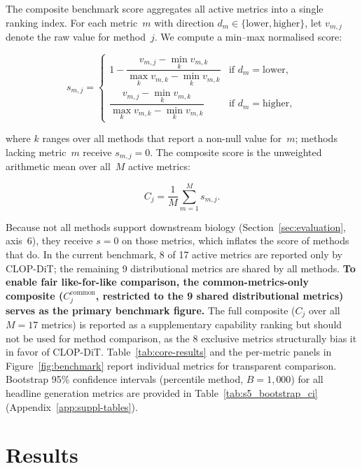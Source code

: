 \documentclass[genes,article,submit,pdftex,oneauthor]{Definitions/mdpi}
\begin{document}
The composite benchmark score aggregates all active metrics into a single ranking index. For each metric~$m$ with direction $d_m \in \{\text{lower}, \text{higher}\}$, let $v_{m,j}$ denote the raw value for method~$j$. We compute a min--max normalised score:
\begin{linenomath}
\begin{equation}
  s_{m,j} =
  \begin{cases}
    1 - \dfrac{v_{m,j} - \min_k v_{m,k}}{\max_k v_{m,k} - \min_k v_{m,k}} & \text{if } d_m = \text{lower},\\[6pt]
    \dfrac{v_{m,j} - \min_k v_{m,k}}{\max_k v_{m,k} - \min_k v_{m,k}} & \text{if } d_m = \text{higher},
  \end{cases}
  \label{eq:norm}
\end{equation}
\end{linenomath}
where $k$ ranges over all methods that report a non-null value for~$m$; methods lacking metric~$m$ receive $s_{m,j} = 0$. The composite score is the unweighted arithmetic mean over all~$M$ active metrics:
\begin{linenomath}
\begin{equation}
  C_j = \frac{1}{M}\sum_{m=1}^{M} s_{m,j}.
  \label{eq:composite}
\end{equation}
\end{linenomath}
Because not all methods support downstream biology (Section~\ref{sec:evaluation}, axis~6), they receive $s = 0$ on those metrics, which inflates the score of methods that do. In the current benchmark, 8 of 17 active metrics are reported only by CLOP-DiT; the remaining 9 distributional metrics are shared by all methods. \textbf{To enable fair like-for-like comparison, the common-metrics-only composite ($C_j^{\text{common}}$, restricted to the 9 shared distributional metrics) serves as the primary benchmark figure.} The full composite ($C_j$ over all $M = 17$ metrics) is reported as a supplementary capability ranking but should not be used for method comparison, as the 8 exclusive metrics structurally bias it in favor of CLOP-DiT. Table~\ref{tab:core-results} and the per-metric panels in Figure~\ref{fig:benchmark} report individual metrics for transparent comparison. Bootstrap 95\% confidence intervals (percentile method, $B{=}1{,}000$) for all headline generation metrics are provided in Table~\ref{tab:s5_bootstrap_ci} (Appendix~\ref{app:suppl-tables}).

\section{Results}\label{sec:results}
\end{document}
